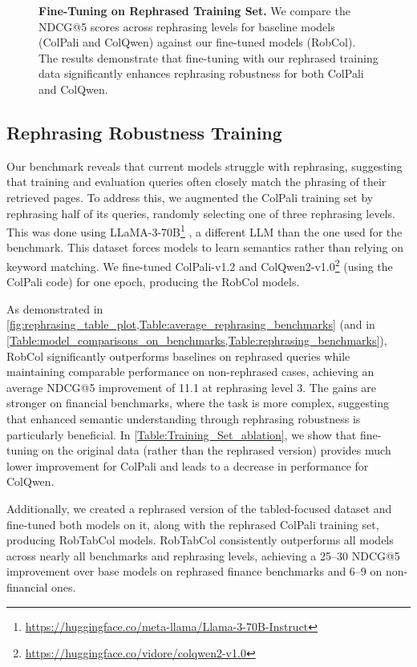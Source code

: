\begin{figure*}[ht]
\begin{minipage}{0.58\textwidth}
        \begin{minipage}{0.95\linewidth} %
            \centering
            \vspace{0.41cm}
            \caption{\textbf{Fine-Tuning on Rephrased Training Set.} We compare the NDCG@5 scores across rephrasing levels for baseline models (ColPali and ColQwen) against our fine-tuned models (RobCol). The results demonstrate that fine-tuning with our rephrased training data significantly enhances rephrasing robustness for both ColPali and ColQwen.}
            \label{fig:rephrasing_table_plot}
        \end{minipage}
    \end{minipage}
    \vspace{-0.4cm}
\end{figure*}

\subsection{Rephrasing Robustness Training}  
Our benchmark reveals that current models struggle with rephrasing, suggesting that training and evaluation queries often closely match the phrasing of their retrieved pages. To address this, we augmented the ColPali training set by rephrasing half of its queries, randomly selecting one of three rephrasing levels. This was done using 
LLaMA-3-70B\footnote{\url{https://huggingface.co/meta-llama/Llama-3-70B-Instruct}}
, a different LLM than the one used for the benchmark. 
This dataset forces models to learn semantics rather than relying on keyword matching. We fine-tuned ColPali-v1.2 and 
ColQwen2-v1.0\footnote{\url{https://huggingface.co/vidore/colqwen2-v1.0}}
(using the ColPali code) for one epoch, producing the RobCol models.  




\noindent
As demonstrated in \cref{fig:rephrasing_table_plot,Table:average_rephrasing_benchmarks} (and in \cref{Table:model_comparisons_on_benchmarks,Table:rephrasing_benchmarks}),
RobCol significantly outperforms baselines on rephrased queries while maintaining comparable performance on non-rephrased cases, achieving an average NDCG@5 improvement of 11.1 at rephrasing level 3. 
The gains are stronger on financial benchmarks, where the task is more complex, suggesting that enhanced semantic understanding through rephrasing robustness is particularly beneficial. In \cref{Table:Training_Set_ablation}, we show that fine-tuning on the original data (rather than the rephrased version) provides much lower improvement for ColPali and leads to a decrease in performance for ColQwen.

\noindent
Additionally, we created a rephrased version of the tabled-focused dataset and fine-tuned both models on it, along with the rephrased ColPali training set, producing RobTabCol models. RobTabCol consistently outperforms all models across nearly all benchmarks and rephrasing levels, achieving a 25–30 NDCG@5 improvement over base models on rephrased finance benchmarks and 6–9 on non-financial ones.






